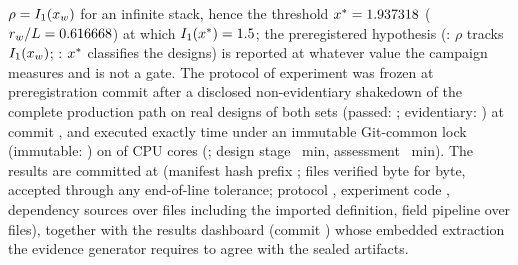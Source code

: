 $\rho = I_1(x_w)$ for an infinite stack, hence the threshold
$x^* = 1.937318$ ($r_w/L = 0.616668$) at which
$I_1(x^*) = 1.5$; the preregistered hypothesis
(\SwtHOne: $\rho$ tracks $I_1(x_w)$; \SwtHTwo: $x^*$ classifies the
designs) is reported at whatever value the campaign measures and is not a gate. The
protocol of experiment \texttt{\SwtExperimentId} was frozen at preregistration commit
\texttt{\SwtPreregCommit} after a disclosed non-evidentiary shakedown of the complete
production path on \SwtShakedownDesigns{} real designs of both sets (passed:
\SwtShakedownPassed; evidentiary: \SwtShakedownEvidentiary) at commit
\texttt{\SwtShakedownCommit}, and executed exactly \SwtAttemptCount{} time under an
immutable Git-common lock (immutable: \SwtLockImmutable) on \SwtWorkerPool{} of
\SwtCpuCount{} CPU cores (\texttt{\SwtDevice}; design stage \SwtStageWallMin{}~min,
assessment \SwtAssessmentWallMin{}~min). The results are committed at
\texttt{\SwtResultsCommit} (manifest hash prefix \texttt{\SwtManifestSha};
\SwtVerifiedFiles{} files verified byte for byte, \SwtToleratedEolFiles{} accepted
through any end-of-line tolerance; protocol \texttt{\SwtProtocolSha}, experiment code
\texttt{\SwtExperimentCodeSha}, dependency sources \texttt{\SwtDependencySourceSha}
over \SwtDependencySourceFiles{} files including the imported definition, field
pipeline \texttt{\SwtFieldPipelineSha} over \SwtFieldPipelineFiles{} files), together
with the results dashboard (commit \texttt{\SwtDashboardCommit}) whose embedded
extraction the evidence generator requires to agree with the sealed artifacts.
\SwtDesignBoxTable

